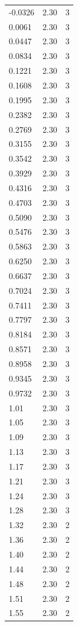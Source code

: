 \begin{longtable}{lrr}
  -0.0326 & 2.30 & 3 \\
  0.0061 & 2.30 & 3 \\
  0.0447 & 2.30 & 3 \\
  0.0834 & 2.30 & 3 \\
  0.1221 & 2.30 & 3 \\
  0.1608 & 2.30 & 3 \\
  0.1995 & 2.30 & 3 \\
  0.2382 & 2.30 & 3 \\
  0.2769 & 2.30 & 3 \\
  0.3155 & 2.30 & 3 \\
  0.3542 & 2.30 & 3 \\
  0.3929 & 2.30 & 3 \\
  0.4316 & 2.30 & 3 \\
  0.4703 & 2.30 & 3 \\
  0.5090 & 2.30 & 3 \\
  0.5476 & 2.30 & 3 \\
  0.5863 & 2.30 & 3 \\
  0.6250 & 2.30 & 3 \\
  0.6637 & 2.30 & 3 \\
  0.7024 & 2.30 & 3 \\
  0.7411 & 2.30 & 3 \\
  0.7797 & 2.30 & 3 \\
  0.8184 & 2.30 & 3 \\
  0.8571 & 2.30 & 3 \\
  0.8958 & 2.30 & 3 \\
  0.9345 & 2.30 & 3 \\
  0.9732 & 2.30 & 3 \\
  1.01 & 2.30 & 3 \\
  1.05 & 2.30 & 3 \\
  1.09 & 2.30 & 3 \\
  1.13 & 2.30 & 3 \\
  1.17 & 2.30 & 3 \\
  1.21 & 2.30 & 3 \\
  1.24 & 2.30 & 3 \\
  1.28 & 2.30 & 3 \\
  1.32 & 2.30 & 2 \\
  1.36 & 2.30 & 2 \\
  1.40 & 2.30 & 2 \\
  1.44 & 2.30 & 2 \\
  1.48 & 2.30 & 2 \\
  1.51 & 2.30 & 2 \\
  1.55 & 2.30 & 2 \\

\end{longtable}

